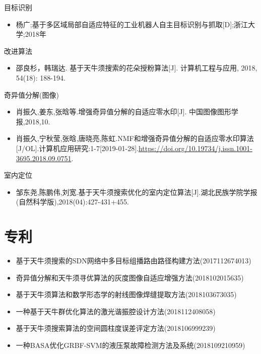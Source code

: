 \documentclass[]{ctexbook}
\providecommand{\tightlist}{%
  \setlength{\itemsep}{0pt}\setlength{\parskip}{0pt}}
\begin{document}
目标识别

\begin{itemize}
\tightlist
\item
  杨广;基于多区域局部自适应特征的工业机器人自主目标识别与抓取{[}D{]};浙江大学;2018年
\end{itemize}

改进算法

\begin{itemize}
\tightlist
\item
  邵良杉，韩瑞达. 基于天牛须搜索的花朵授粉算法{[}J{]}. 计算机工程与应用,
  2018, 54(18): 188-194.
\end{itemize}

奇异值分解(图像)

\begin{itemize}
\tightlist
\item
  肖振久,姜东,张晗等.增强奇异值分解的自适应零水印{[}J{]}.
  中国图像图形学报,2018,10.
\item
  肖振久,宁秋莹,张晗,唐晓亮,陈虹.NMF和增强奇异值分解的自适应零水印算法{[}J/OL{]}.计算机应用研究:1-7{[}2019-01-28{]}.\url{https://doi.org/10.19734/j.issn.1001-3695.2018.09.0751}.
\end{itemize}

室内定位

\begin{itemize}
\tightlist
\item
  邹东尧,陈鹏伟,刘宽.基于天牛须搜索优化的室内定位算法{[}J{]}.湖北民族学院学报(自然科学版),2018(04):427-431+455.
\end{itemize}

\section{专利}

\begin{itemize}
\tightlist
\item
  基于天牛须搜索的SDN网络中多目标组播路由路径构建方法(2017112674013)
\item
  奇异值分解和天牛须寻优算法的灰度图像自适应增强方法(2018102015635)
\item
  基于天牛须算法和数学形态学的射线图像焊缝提取方法(2018103673035)
\item
  一种基于天牛群优化算法的激光谐振腔设计方法(2018112408058)
\item
  基于天牛须搜索算法的空间圆柱度误差评定方法(2018106999239)
\item
  一种BASA优化GRBF-SVM的液压泵故障检测方法及系统(2018109210959)
\end{itemize}
\end{document}
